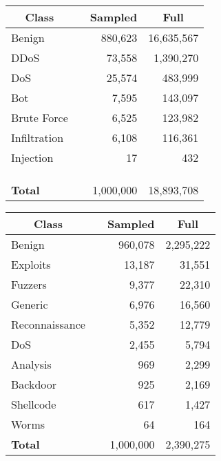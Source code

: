 \hfill
\begin{minipage}{.48\textwidth}
  \small
  \begin{tabularx}{\linewidth}{lXrr}
    \toprule %
    \multicolumn{1}{c}{\textbf{Class}} & & \multicolumn{1}{c}{\textbf{Sampled}} & \multicolumn{1}{c}{\textbf{Full}} \\
    \midrule %
    Benign         & & 880,623   & 16,635,567 \\
    DDoS           & & 73,558    & 1,390,270  \\
    DoS            & & 25,574    & 483,999    \\
    Bot            & & 7,595     & 143,097    \\
    Brute Force    & & 6,525     & 123,982    \\
    Infiltration   & & 6,108     & 116,361    \\
    Injection      & & 17        & 432        \\
    & & & \\
    & & & \\
    & & & \\
    \midrule %
    \textbf{Total} & & 1,000,000 & 18,893,708 \\
    \bottomrule %
  \end{tabularx}
\end{minipage}
\hfill
\begin{minipage}{.48\textwidth}
  \small
  \begin{tabularx}{\linewidth}{lXrr}
    \toprule %
    \multicolumn{1}{c}{\textbf{Class}} & & \multicolumn{1}{c}{\textbf{Sampled}} & \multicolumn{1}{c}{\textbf{Full}} \\
    \midrule %
    Benign           & & 960,078  & 2,295,222   \\
    Exploits         & & 13,187   & 31,551      \\
    Fuzzers          & & 9,377    & 22,310      \\
    Generic          & & 6,976    & 16,560      \\
    Reconnaissance   & & 5,352    & 12,779      \\
    DoS              & & 2,455    & 5,794       \\
    Analysis         & & 969      & 2,299       \\
    Backdoor         & & 925      & 2,169       \\
    Shellcode        & & 617      & 1,427       \\
    Worms            & & 64       & 164         \\
    \midrule %
    \textbf{Total}   & & 1,000,000 & 2,390,275  \\
    \bottomrule %
  \end{tabularx}
\end{minipage}
\hfill